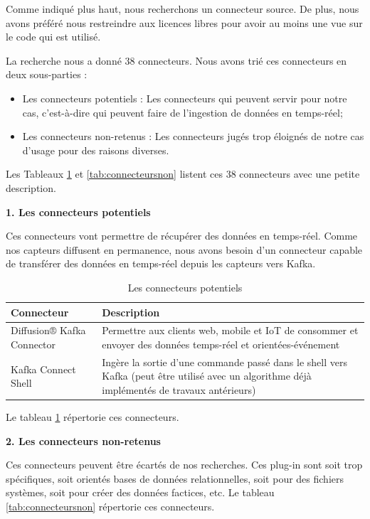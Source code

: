 \documentclass[11pt]{article}
\begin{document}
			Comme indiqué plus haut, nous recherchons un connecteur source.
			De plus, nous avons préféré nous restreindre aux licences libres pour avoir au moins une vue sur le code qui est utilisé.\par
			La recherche nous a donné 38 connecteurs.
			Nous avons trié ces connecteurs en deux sous-parties :
			\begin{itemize}
				\item Les connecteurs potentiels : Les connecteurs qui peuvent servir pour notre cas, c'est-à-dire qui peuvent faire de l’ingestion de données en temps-réel;
				\item Les connecteurs non-retenus : Les connecteurs jugés trop éloignés de notre cas d’usage pour des raisons diverses.
			\end{itemize}
			Les Tableaux \ref{tab:potentiels} et \ref{tab:connecteursnon} listent ces 38 connecteurs avec une petite description.\par
			\textbf{1. Les connecteurs potentiels}\par
			Ces connecteurs vont permettre de récupérer des données en temps-réel. 
			Comme nos capteurs diffusent en permanence, nous avons besoin d’un connecteur capable de transférer des données en temps-réel depuis les capteurs vers Kafka.
			\begin{table}[h]
				\begin{tabular}{|p{7.5cm}|p{7.5cm}|}
					\hline
					\rowcolor{lightgray} Connecteur & Description\\\hline
					Diffusion® Kafka Connector & Permettre aux clients web, mobile et IoT de consommer et envoyer des données temps-réel et orientées-événement\\\hline
					Kafka Connect Shell & Ingère la sortie d’une commande passé dans le shell vers Kafka (peut être utilisé avec un algorithme déjà implémentés de travaux antérieurs) \\\hline
				\end{tabular}
				\caption{Les connecteurs potentiels}
				\label{tab:potentiels}
			\end{table}
			Le tableau \ref{tab:potentiels} répertorie ces connecteurs.\par
			\textbf{2. Les connecteurs non-retenus}\par
			Ces connecteurs peuvent être écartés de nos recherches. 
			Ces plug-in sont soit trop spécifiques, soit orientés bases de données relationnelles, soit pour des fichiers systèmes, soit pour créer des données factices, etc.
			Le tableau \ref{tab:connecteursnon} répertorie ces connecteurs.
\end{document}
